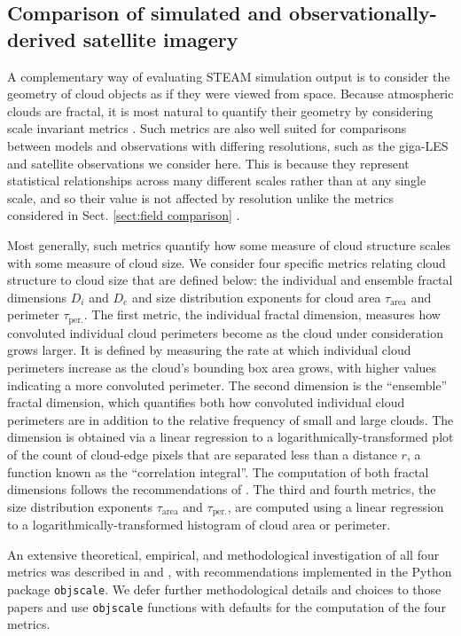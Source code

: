 \documentclass[acp, manuscript, english]{copernicus}
\begin{document}
\subsection{Comparison of simulated and observationally-derived satellite imagery} \label{sect:satellite comparison}

A complementary way of evaluating STEAM simulation output is to consider the geometry of cloud objects as if they were viewed from space. Because atmospheric clouds are fractal, it is most natural to quantify their geometry by considering scale invariant metrics \citep{dewitt2026}. Such metrics are also well suited for comparisons between models and observations with differing resolutions, such as the giga-LES and satellite observations we consider here. This is because they represent statistical relationships across many different scales rather than at any single scale, and so their value is not affected by resolution unlike the metrics considered in Sect. \ref{sect:field comparison} \citep{dewitt2026}.

Most generally, such metrics quantify how some measure of cloud structure scales with some measure of cloud size. We consider four specific metrics relating cloud structure to cloud size that are defined below: the individual and ensemble fractal dimensions $D_i$ and $D_e$ and size distribution exponents for cloud area $\tau_\mathrm{area}$ and perimeter $\tau_{\mathrm{per.}}$. 
The first metric, the individual fractal dimension, measures how convoluted individual cloud perimeters become as the cloud under consideration grows larger. It is defined by measuring the rate at which individual cloud perimeters increase as the cloud's bounding box area grows, with higher values indicating a more convoluted perimeter. 
The second dimension is the ``ensemble'' fractal dimension, which quantifies both how convoluted individual cloud perimeters are in addition to the relative frequency of small and large clouds. The dimension is obtained via a linear regression to a logarithmically-transformed plot of the count of cloud-edge pixels that are separated less than a distance $r$, a function known as the ``correlation integral''.  The computation of both fractal dimensions follows the recommendations of \citet{dewitt2026}.
The third and fourth metrics, the size distribution exponents $\tau_\mathrm{area}$ and $\tau_{\mathrm{per.}}$, are computed using a linear regression to a logarithmically-transformed histogram of cloud area or perimeter. 

An extensive theoretical, empirical, and methodological investigation of all four metrics was described in \citet{dewitt2024,dewitt2024b} and \citet{dewitt2026}, with recommendations implemented in the Python package \verb|objscale|. We defer further methodological details and choices to those papers and use \verb|objscale| functions with defaults for the computation of the four metrics.
\end{document}
